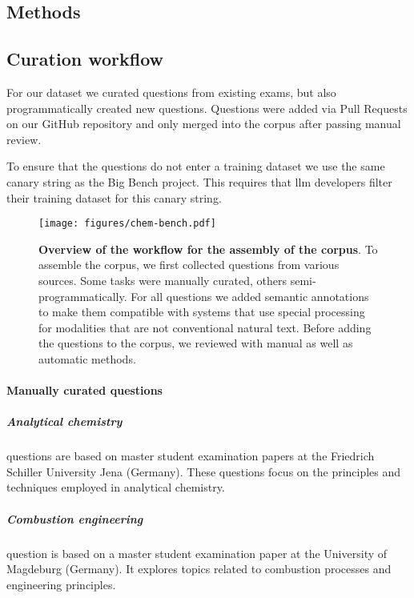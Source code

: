 \documentclass[11pt, oneside]{article}
\begin{document}
\begin{refsection}
\clearpage

\section{Methods}

\subsection{Curation workflow}\label{sec:curation}
For our dataset we curated questions from existing exams, but also programmatically created new questions.
Questions were added via Pull Requests on our GitHub repository and only merged into the corpus after passing manual review.

To ensure that the questions do not enter a training dataset we use the same canary string as the Big Bench project.
This requires that \Gls{llm} developers filter their training dataset for this canary string.\autocite{openai2024gpt4, srivastava2022beyond}

\begin{figure}[!h]
    \texttt{[image: figures/chem-bench.pdf]}
    \caption{\textbf{Overview of the workflow for the assembly of the \chembench corpus}. To assemble the \chembench corpus, we first collected questions from various sources. Some tasks were manually curated, others semi-programmatically. For all questions we added semantic annotations to make them compatible with systems that use special processing for modalities that are not conventional natural text. Before adding the questions to the corpus, we reviewed with manual as well as automatic methods.}
    \label{fig:curation_workflow}
\end{figure}

\paragraph{Manually curated questions}

\subparagraph{Analytical chemistry}
 questions are based on master student examination papers at the Friedrich Schiller University Jena (Germany). 
These questions focus on the principles and techniques employed in analytical chemistry.

\subparagraph{Combustion engineering}
 question is based on a master student examination paper at the University of Magdeburg (Germany). 
It explores topics related to combustion processes and engineering principles.


\end{refsection}
\end{document}
